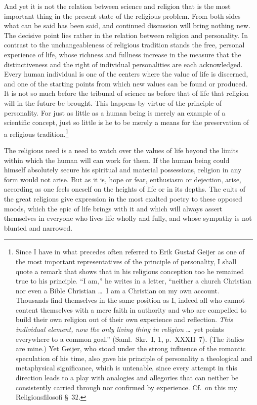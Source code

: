 \documentclass[12pt]{article}
\newcommand{\opage}[1]{\marginnote{\footnotesize\textit{[#1]}}}
\begin{document}
And yet it is not the relation between science and religion that is the most
important thing in the present state of the religious problem. From both sides
what can be said has been said, and continued discussion will bring nothing new.
The decisive point lies rather in the relation between religion and personality.
In contrast to the unchangeableness of religious tradition stands the free,
personal experience of life, whose richness and fullness increase in the measure
that the distinctiveness and the right of individual personalities are each
acknowledged. Every human individual is one of the centers
\opage{67}%
where the value of life is discerned, and one of the starting points from which
new values can be found or produced. It is not so much before the tribunal of
science as before that of life that religion will in the future be brought. This
happens by virtue of the principle of personality. For just as little as a human
being is merely an example of a scientific concept, just so little is he to be
merely a means for the preservation of a religious tradition.\footnote{Since I
have in what precedes often referred to Erik Gustaf Geijer as one of the most
important representatives of the principle of personality, I shall quote a
remark that shows that in his religious conception too he remained true to his
principle. ``I am,'' he writes in a letter, ``neither a church Christian nor even
a Bible Christian \ldots\ I am a Christian on my own account. Thousands find
themselves in the same position as I, indeed all who cannot content themselves
with a mere faith in authority and who are compelled to build their own religion
out of their own experience and reflection. \textit{This individual element, now
the only living thing in religion} \ldots\ yet points everywhere to a common
goal.'' (Saml.\ Skr.\ I, 1, p.~XXXII~7). (The italics are mine.) Yet Geijer, who
stood under the strong influence of the romantic speculation of his time, also
gave his principle of personality a theological and metaphysical significance,
which is untenable, since every attempt in this direction leads to a play with
analogies and allegories that can neither be consistently carried through nor
confirmed by experience. Cf.\ on this my Religionsfilosofi §~32.}

\opage{68}%
The religious need is a need to watch over the values of life beyond the limits
within which the human will can work for them. If the human being could himself
absolutely secure his spiritual and material possessions, religion in any form
would not arise. But as it is, hope or fear, enthusiasm or dejection, arise,
according as one feels oneself on the heights of life or in its depths. The cults
of the great religions give expression in the most exalted poetry to these
opposed moods, which the epic of life brings with it and which will always assert
themselves in everyone who lives life wholly and fully, and whose sympathy is not
blunted and narrowed.
\end{document}
